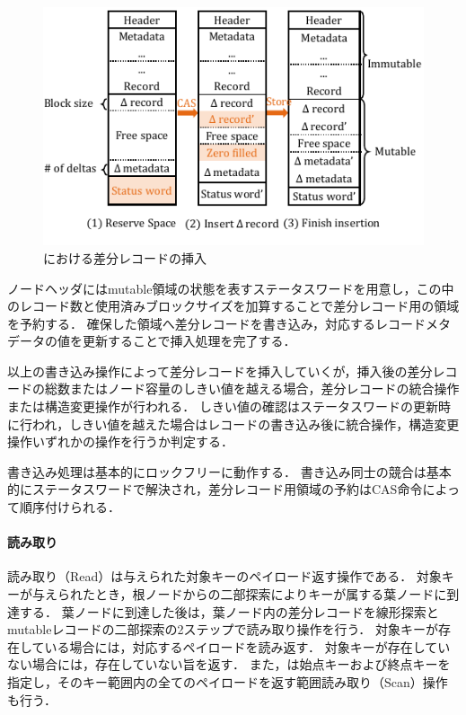\begin{figure}[t]
    \centering
    \includegraphics{./figures/Bc-insertion.pdf}
    \caption{\Bctree{}における差分レコードの挿入}
    \label{fig:bc_tree_insertion}
\end{figure}

ノードヘッダにはmutable領域の状態を表すステータスワードを用意し，この中のレコード数と使用済みブロックサイズを加算することで差分レコード用の領域を予約する．
確保した領域へ差分レコードを書き込み，対応するレコードメタデータの値を更新することで挿入処理を完了する．

以上の書き込み操作によって差分レコードを挿入していくが，挿入後の差分レコードの総数またはノード容量のしきい値を越える場合，差分レコードの統合操作または構造変更操作が行われる．
しきい値の確認はステータスワードの更新時に行われ，しきい値を越えた場合はレコードの書き込み後に統合操作，構造変更操作いずれかの操作を行うか判定する．

書き込み処理は基本的にロックフリーに動作する．
書き込み同士の競合は基本的にステータスワードで解決され，差分レコード用領域の予約はCAS命令によって順序付けられる．

\paragraph{読み取り}

読み取り（Read）は与えられた対象キーのペイロード返す操作である．
対象キーが与えられたとき，根ノードからの二部探索によりキーが属する葉ノードに到達する．
葉ノードに到達した後は，葉ノード内の差分レコードを線形探索とmutableレコードの二部探索の2ステップで読み取り操作を行う．
対象キーが存在している場合には，対応するペイロードを読み返す．
対象キーが存在していない場合には，存在していない旨を返す．
また，\Bctree{}は始点キーおよび終点キーを指定し，そのキー範囲内の全てのペイロードを返す範囲読み取り（Scan）操作も行う．

